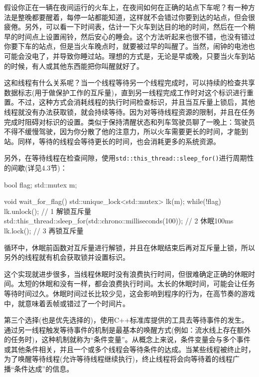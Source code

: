 
假设你正在一辆在夜间运行的火车上，在夜间如何在正确的站点下车呢？有一种方法是整晚都要醒着，每停一站都能知道，这样就不会错过你要到达的站点，但会很疲倦。另外，可以看一下时间表，估计一下火车到达目的地的时间，然后在一个稍早的时间点上设置闹铃，然后安心的睡会。这个方法听起来也很不错，也没有错过你要下车的站点，但是当火车晚点时，就要被过早的叫醒了。当然，闹钟的电池也可能会没电了，并导致你睡过站。理想的方式是，无论是早或晚，只要当火车到站的时候，有人或其他东西能把你叫醒就好了。

这和线程有什么关系呢？当一个线程等待另一个线程完成时，可以持续的检查共享数据标志(用于做保护工作的互斥量)，直到另一线程完成工作时对这个标识进行重置。不过，这种方式会消耗线程的执行时间检查标识，并且当互斥量上锁后，其他线程就没有办法获取锁，就会持续等待。因为对等待线程资源的限制，并且在任务完成时阻碍对标识的设置。类似于保持清醒状态和列车驾驶员聊了一晚上：驾驶员不得不缓慢驾驶，因为你分散了他的注意力，所以火车需要更长的时间，才能到站。同样，等待的线程会等待更长的时间，也会消耗更多的系统资源。

另外，在等待线程在检查间隙，使用\texttt{std::this\_thread::sleep\_for()}进行周期性的间歇(详见4.3节)：

\begin{cpp}
bool flag;
std::mutex m;

void wait_for_flag()
{
  std::unique_lock<std::mutex> lk(m);
  while(!flag)
  {
    lk.unlock();  // 1 解锁互斥量
    std::this_thread::sleep_for(std::chrono::milliseconds(100));  // 2 休眠100ms
    lk.lock();   // 3 再锁互斥量
  }
}
\end{cpp}

循环中，休眠前函数对互斥量进行解锁，并且在休眠结束后再对互斥量上锁，所以另外的线程就有机会获取锁并设置标识。

这个实现就进步很多，当线程休眠时没有浪费执行时间，但很难确定正确的休眠时间。太短的休眠和没有一样，都会浪费执行时间。太长的休眠时间，可能会让任务等待时间过久。休眠时间过长比较少见，这会影响到程序的行为，在高节奏的游戏中，就意味着丢帧或错过了一个时间片。

第三个选择(也是优先选择的)，使用C++标准库提供的工具去等待事件的发生。通过另一线程触发等待事件的机制是最基本的唤醒方式(例如：流水线上存在额外的任务时)，这种机制就称为“条件变量”。从概念上来说，条件变量会与多个事件或其他条件相关，并且一个或多个线程会等待条件的达成。当某些线程被终止时，为了唤醒等待线程(允许等待线程继续执行)，终止线程将会向等待着的线程广播“条件达成”的信息。


